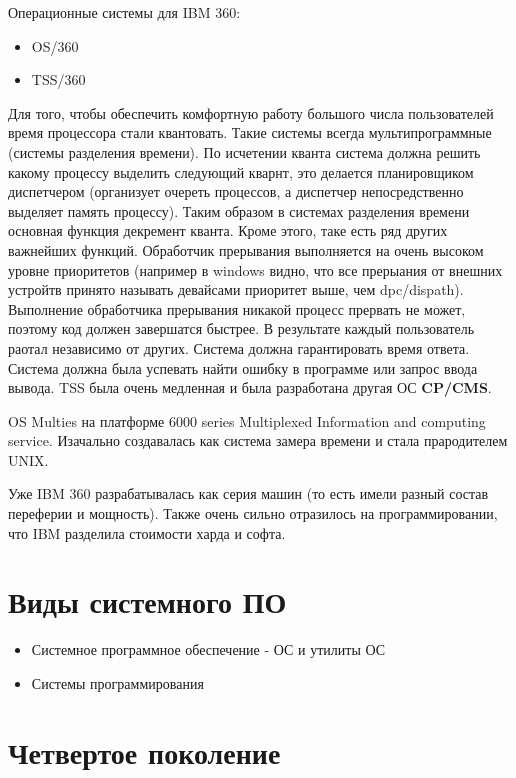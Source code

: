 \documentclass[a4paper, 14pt]{report}
\begin{document}
    Операционные системы для IBM 360:

    \begin{itemize}
        \item OS/360
        \item TSS/360
    \end{itemize}

    Для того, чтобы обеспечить комфортную работу большого числа пользователей время процессора стали квантовать. Такие системы всегда мультипрограммные (системы разделения времени). По исчетении кванта система должна решить какому процессу выделить следующий кварнт, это делается планировщиком диспетчером (организует очереть процессов, а диспетчер непосредственно выделяет память процессу). Таким образом в системах разделения времени основная функция декремент кванта. Кроме этого, таке есть ряд других важнейших функций. Обработчик прерывания выполняется на очень высоком уровне приоритетов (например в windows видно, что все прерыания от внешних устройтв принято называть девайсами приоритет выше, чем dpc/dispath). Выполнение обработчика прерывания никакой процесс прервать не может, поэтому код должен завершатся быстрее. В результате каждый пользователь раотал независимо от других. Система должна гарантировать время ответа. Система должна была успевать найти ошибку в программе или запрос ввода вывода. TSS была очень медленная и была разработана другая ОС \textbf{CP/CMS}.

    OS Multies на платформе 6000 series Multiplexed Information and computing service. Изачально создавалась как система замера времени и стала прародителем UNIX.

    Уже IBM 360 разрабатывалась как серия машин (то есть имели разный состав переферии и мощность). Также очень сильно отразилось на программировании, что IBM разделила стоимости харда и софта.

    \section{Виды системного ПО}

    \begin{itemize}
        \item Системное программное обеспечение - ОС и утилиты ОС
        \item Системы программирования
    \end{itemize}

    \section{Четвертое поколение}
\end{document}
